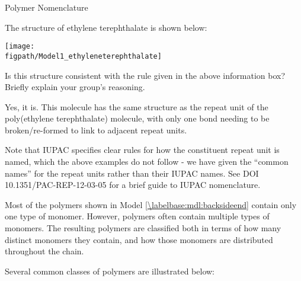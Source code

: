 \begin{activity}{Polymer Nomenclature}
\begin{ctqs}
	\question The structure of ethylene terephthalate is shown below:
	
		\centerline{\texttt{[image: \\figpath/Model1\_ethyleneterephthalate]}}
		
		Is this structure consistent with the rule given in the above information box?  Briefly explain your group's reasoning.
		
		\begin{solution}[0.75in]
			Yes, it is.  This molecule has the same structure as the repeat unit of the poly(ethylene terephthalate) molecule, with only one bond needing to be broken/re-formed to link to adjacent repeat units.
			
			Note that IUPAC specifies clear rules for how the constituent repeat unit is named, which the above examples do not follow - we have given the ``common names'' for the repeat units rather than their IUPAC names.  See DOI 10.1351/PAC-REP-12-03-05 for a brief guide to IUPAC nomenclature.
			
		\end{solution}

\end{ctqs}


\clearpage


\begin{model}[Composition]
\label{\labelbase:mdl:composition}

	Most of the polymers shown in Model \ref{\labelbase:mdl:backsideend} contain only one type of monomer.  However, polymers often contain multiple types of monomers.  The resulting polymers are classified both in terms of how many distinct monomers they contain, and how those monomers are distributed throughout the chain.
	
	Several common classes of polymers are illustrated below:
	

\end{model}
\end{activity}
